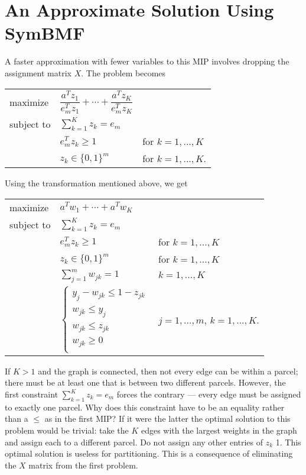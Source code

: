 \section{An Approximate Solution Using SymBMF}

A faster approximation with fewer variables to this MIP involves
dropping the assignment matrix $X$. The problem becomes

\begin{center}
\bgroup
\def\arraystretch{1.5}
\begin{tabular}{l l l}
maximize   & $\dfrac{a^T z_1}{e_m^T z_1} + \cdots +
              \dfrac{a^T z_K}{e_m^T z_K}$ \\
subject to & $\sum_{k=1}^K z_k = e_m$ \\
           & $e_m^T z_k \geq 1$   & for $k = 1, ..., K$ \\
           & $z_k \in \{0, 1\}^m$ & for $k = 1, ..., K$. \\
\end{tabular}
\egroup
\end{center}

Using the \cite{Li:94} transformation mentioned above, we get

\begin{center}
\bgroup
\def\arraystretch{1.5}
\begin{tabular}{l l l}
maximize   & $a^T w_1 + \cdots + a^T w_K$ \\
subject to & $\sum_{k=1}^K z_k = e_m$ \\
           & $e_m^T z_k \geq 1$  & for $k = 1, ..., K$ \\
           & $z_k \in \{0, 1\}^m$ & for $k = 1, ..., K$ \\
           & $\sum_{j=1}^m w_{jk} = 1$ & $k = 1, ..., K$ \\
           & $\begin{cases}
                y_j - w_{jk} \leq 1 - z_{jk} \\
                w_{jk} \leq y_j \\
                w_{jk} \leq z_{jk} \\
                w_{jk} \geq 0 \\
             \end{cases}$
           & $j = 1, ..., m$, $k = 1, ..., K$. \\
\end{tabular}
\egroup
\end{center}

If $K > 1$ and the graph is connected, then not every edge can be
within a parcel; there must be at least one that is between two
different parcels. However, the first constraint
$\sum_{k=1}^K z_k = e_m$ forces the contrary --- every edge must be
assigned to exactly one parcel. Why does this constraint have to be an
equality rather than a $\leq$ as in the first MIP? If it were the latter
the optimal solution to this problem would be trivial: take the $K$
edges with the largest weights in the graph and assign each to a
different parcel. Do not assign any other entries of $z_k$ 1. This
optimal solution is useless for partitioning. This is a consequence of
eliminating the $X$ matrix from the first problem.

